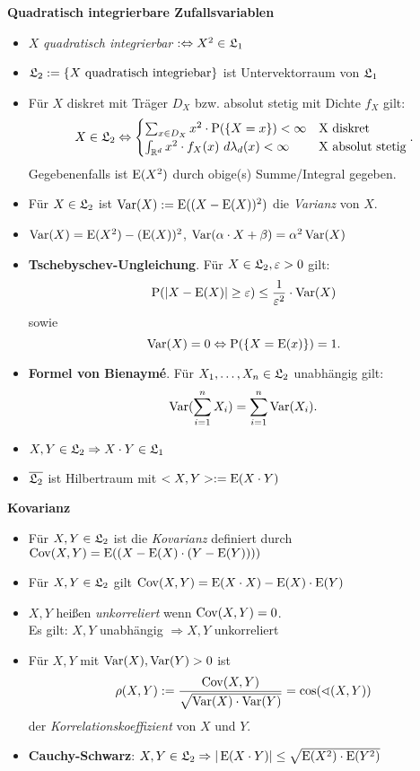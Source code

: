 \textbf{Quadratisch integrierbare Zufallsvariablen}
\begin{itemize}
\item $X$ \textit{quadratisch integrierbar} $:\Leftrightarrow X^2\in\mathfrak{L}_1$

\item $\mathfrak{L}_2:=\{X \text{ quadratisch integriebar}\}$ ist Untervektorraum von $\mathfrak{L}_1$

\item Für $X$ diskret mit Träger $D_X$ bzw. absolut stetig mit Dichte $f_X$ gilt:
\[
	X\in\mathfrak{L}_2\Leftrightarrow
	\begin{cases}
	\sum_{x\in D_X} x^2\cdot\operatorname{P}(\{X=x\})<\infty			& \text{X diskret} \\
	\int_{\mathbb{R}^d} x^2\cdot f_X(x)~d\lambda_d(x)<\infty		& \text{X absolut stetig}
	\end{cases}.
\]
Gegebenenfalls ist $\operatorname{E}(X^2)$ durch obige(s) Summe/Integral gegeben.

\item Für $X\in\mathfrak{L}_2$ ist $\operatorname{Var}(X):=\operatorname{E}((X-\operatorname{E}(X))^2)$ die \textit{Varianz} von $X$.

\item $\operatorname{Var}(X)=\operatorname{E}(X^2)-(\operatorname{E}(X))^2$, \quad $\operatorname{Var}(\alpha\cdot X+\beta)=\alpha^2\operatorname{Var}(X)$

\item \textbf{Tschebyschev-Ungleichung}. Für $X\in\mathfrak{L}_2, \varepsilon>0$ gilt:
\[
	\operatorname{P}(|X-\operatorname{E}(X)|\geq \varepsilon)\leq \frac{1}{\varepsilon^2}\cdot\operatorname{Var}(X)
\]
sowie
\[
	\operatorname{Var}(X)=0 \Leftrightarrow \operatorname{P}(\{X=\operatorname{E}(x)\})=1.
\]

\item \textbf{Formel von Bienaymé}. Für $X_1,\ldots,X_n\in\mathfrak{L}_2$ unabhängig gilt:
\[
	\operatorname{Var}(\sum_{i=1}^n X_i) = \sum_{i=1}^n\operatorname{Var}(X_i).
\]

\item $X,Y\in\mathfrak{L}_2\Rightarrow X\cdot Y\in\mathfrak{L}_1$

\item $\overline{\mathfrak{L}_2}$ ist Hilbertraum mit $<X,Y>:=\operatorname{E}(X\cdot Y)$
\end{itemize}
\hspace{3em}

\textbf{Kovarianz}
\begin{itemize}
\item Für $X,Y\in\mathfrak{L}_2$ ist die \textit{Kovarianz} definiert durch
$\operatorname{Cov}(X,Y)=\operatorname{E}((X-\operatorname{E}(X)\cdot (Y-\operatorname{E}(Y))))$

\item Für $X,Y\in\mathfrak{L}_2$ gilt $\operatorname{Cov}(X,Y)=\operatorname{E}(X\cdot X)-\operatorname{E}(X)\cdot\operatorname{E}(Y)$

\item $X,Y$ heißen \textit{unkorreliert} wenn $\operatorname{Cov}(X,Y)=0$.\\
Es gilt: $X,Y$ unabhängig $\Rightarrow X,Y$ unkorreliert

\item Für $X,Y$ mit $\operatorname{Var}(X),\operatorname{Var}(Y)>0$ ist
\[
	\rho(X,Y):=\frac{\operatorname{Cov}(X,Y)}{\sqrt{\operatorname{Var}(X)\cdot\operatorname{Var}(Y)}} = 
	\cos(\sphericalangle (X,Y))
\]
der \textit{Korrelationskoeffizient} von $X$ und $Y$.

\item \textbf{Cauchy-Schwarz}: $X,Y\in\mathfrak{L}_2
\Rightarrow |\operatorname{E}(X\cdot Y)|\leq \sqrt{\operatorname{E}(X^2)\cdot\operatorname{E}(Y^2)}$
\end{itemize}

